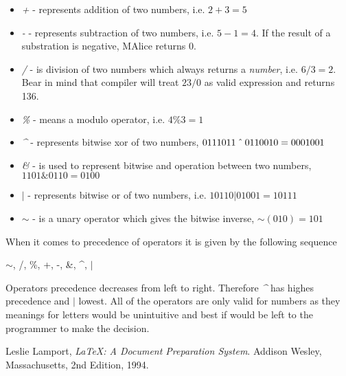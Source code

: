 \documentclass[a4wide, 11pt]{article}
\newcommand\xor{\mathbin{\char `\^}}
\begin{document}
\begin{itemize}

    \item
    \textit{+} - represents addition of two numbers, i.e. $ 2 + 3 = 5 $

    \item
    \textit{-} - represents subtraction of two numbers, i.e. $ 5 - 1 = 4 $. If the result of a substration is negative, MAlice returns 0.

    \item
    \textit{/} - is division of two numbers which always returns a \emph{number}, i.e. $ 6 / 3 = 2 $. Bear in mind that compiler will treat $ 23 / 0 $ as valid expression and returns 136.

    \item
    \textit{\%} - means a modulo operator, i.e. $ 4 \% 3 = 1 $

    \item
    \textit{\textasciicircum{}} - represents bitwise xor of two numbers, $ 0111011 \xor  0110010 = 0001001 $

    \item
    \textit{\&} - is used to represent bitwise and operation between two numbers,  $ 1101 \& 0110 = 0100 $

    \item
    \textit{$|$} - represents bitwise or of two numbers, i.e. $ 10110 | 01001 = 10111 $

    \item
    \textit{$\sim$} - is a unary operator which gives the bitwise inverse, $ \sim(010) = 101 $
    
\end{itemize}

When it comes to precedence of operators it is given by the following sequence

\begin{center} $\sim$, /, \%, +, -, \&, \textasciicircum{}, $|$ \end{center}

Operators precedence decreases from left to right. Therefore \emph{\textasciicircum{}} has highes precedence and \emph{$|$} lowest.
All of the operators are only valid for numbers as they meanings for letters would be unintuitive and best if would be left to the programmer to make the decision.


\begin{thebibliography}{9}

  Leslie Lamport,
  \emph{\LaTeX: A Document Preparation System}.
  Addison Wesley, Massachusetts,
  2nd Edition,
  1994.

\end{thebibliography}
\end{document}

